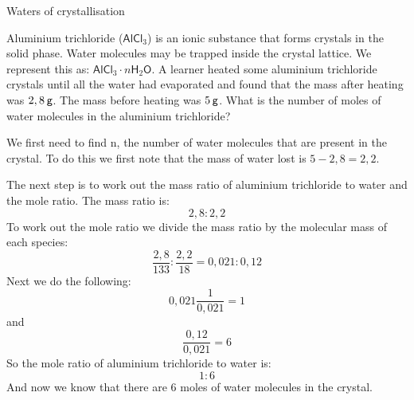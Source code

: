     \noindent
\par
            \label{m38712*eid672431}\vspace{.5cm} 
      \noindent
      \begin{wex}{Waters of crystallisation}{
\label{m38712*pid47982}
\label{m38712*id64827}Aluminium trichloride (${\mathsf{AlCl}}_{3}$) is an ionic substance that forms crystals in the solid phase. Water molecules may be trapped inside the crystal lattice. We represent this as: ${\mathsf{AlCl}}_{3}\ensuremath{\cdot}n{\mathsf{H}}_{2}\mathsf{O}$. A learner heated some aluminium trichloride crystals until all the water had evaporated and found that the mass after heating was $2,8\phantom{\rule{2pt}{0ex}}\mathsf{g}$. The mass before heating was $5\phantom{\rule{2pt}{0ex}}\mathsf{g}$. What is the number of moles of water molecules in the aluminium trichloride?\par 
\vspace{5pt}}
{
We first need to find n, the number of water molecules that are present in the crystal. To do this we first note that the mass of water lost is $5-2,8=2,2$.\pagebreak \par \item \label{m38712*id3892}The next step is to work out the mass ratio of aluminium trichloride to water and the mole ratio. The mass ratio is:
 \label{m38712*eid744672}\nopagebreak\noindent{}
    \begin{equation}
    2,8:2,2
      \end{equation}
To work out the mole ratio we divide the mass ratio by the molecular mass of each species:
\label{m38712*eid7459432}\nopagebreak\noindent{}
    \begin{equation}
    \frac{2,8}{133}:\frac{2,2}{18}=0,021:0,12
      \end{equation}
Next we do the following:
\label{m38712*eid745932432}\nopagebreak\noindent{}
    \begin{equation}
    0,021\frac{1}{0,021}=1
      \end{equation}
     and
\label{m38712*eid74595432432}\nopagebreak\noindent{}
    \begin{equation}
    \frac{0,12}{0,021}=6
      \end{equation}
So the mole ratio of aluminium trichloride to water is:
\label{m38712*eid7459424532}\nopagebreak\noindent{}
    \begin{equation}
    1:6
      \end{equation}
And now we know that there are 6 moles of water molecules in the crystal.\par 
}
    \end{wex}
